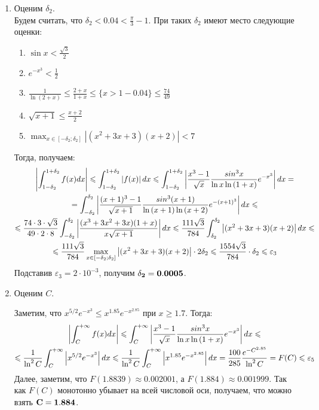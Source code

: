 \documentclass[titlepage]{article}
\def\l{\left}
\def\r{\right}
\def\le{\leqslant}
\def\ge{\geqslant}
\begin{document}
\begin{enumerate}
	\item Оценим $\delta_2$. \\
	Будем считать, что $\delta_2 < 0.04 < \frac{\pi}{3} - 1$. При таких $\delta_2$ имеют место следующие оценки: 
	\begin{enumerate}
		\item $\sin{x} < \frac{\sqrt{3}}{2}$
		\item $e^{-x^3} < \frac{1}{2}$
		\item $\frac{1}{\ln{(2+x)}} \le \frac{2+x}{1+x} \le \{x > 1-0.04\} \le \frac{74}{49} $
		\item $\sqrt{x+1} \le \frac{x+2}{2}$
		\item $\max_{x\in[-\delta_2;\delta_2]}{\l|(x^2+3x+3)(x+2)\r|} < 7$
	\end{enumerate}
	Тогда, получаем:
	\begin{gather}
		\notag \l|\int_{1-\delta_2}^{1+\delta_2}{f(x)dx}\r| \le \int_{1-\delta_2}^{1+\delta_2}{\l|f(x)\r|dx} \le \int_{1-\delta_2}^{1+\delta_2}{\l| \frac{x^3-1}{\sqrt{x}}\frac{sin^{3}{x}}{\ln{x}\ln{(1+x)}}e^{-x^3}\r|dx} = \\
		\notag = \int_{-\delta_2}^{\delta_2}{\l| \frac{(x+1)^3-1}{\sqrt{x+1}}\frac{sin^{3}{(x+1)}}{\ln{(x+1)}\ln{(x+2)}}e^{-(x+1)^3}\r|dx}
		\notag \le \\ 
		\notag \le \frac{74\cdot3\cdot\sqrt{3}}{49\cdot2\cdot8}\int_{-\delta_2}^{\delta_2}{\l| \frac{(x^3+3x^2+3x)(1+x)}{x\sqrt{x+1}}\r|dx} \le \frac{111\sqrt{3}}{784} \int_{\delta_2}^{\delta_2}{\l|(x^2+3x+3)(x+2)\r|dx} \le \\
		\notag \le \frac{111\sqrt{3}}{784}\max_{x \in [-\delta_2; \delta_2]}{\l|(x^2+3x+3)(x+2)\r|}\cdot 2\delta_2 \le \frac{1554\sqrt{3}}{784}\cdot\delta_2 \le \varepsilon_3
	\end{gather}
	Подставив $\varepsilon_3 = 2 \cdot 10^{-3}$, получим $\bf{\delta_2 = 0.0005}$.
	\item Оценим $C$.
	
	Заметим, что $x^{5/2}e^{-x^{3}} \le x^{1.85}e^{-x^{2.85}}$ при $x \ge 1.7$. Тогда:
	\begin{gather}
		\notag \l|\int_{C}^{+\infty}{f(x)dx}\r| \le \int_{C}^{+\infty}{\l| \frac{x^3-1}{\sqrt{x}}\frac{sin^3{x}}{\ln{x}\ln{(1+x)}}e^{-x^3}\r|dx} \le \\
		\notag \le \frac{1}{\ln^2{C}}\int_{C}^{+\infty}{\l|x^{5/2}e^{-x^3}\r|dx} \le \frac{1}{\ln^2{C}}\int_{C}^{+\infty}{\l|x^{1.85}e^{-x^{2.85}}\r|dx} = \frac{100}{285}\frac{e^{-C^{2.85}}}{\ln^2{C}} = F(C) \le \varepsilon_5
	\end{gather}
	Далее, заметим, что $F(1.8839) \approx 0.002001$, а $F(1.884) \approx 0.001999$. Так как $F(C)$ монотонно убывает на всей числовой оси, получаем, что можно взять $\bf{C = 1.884}$. 
\end{enumerate}
\end{document}

